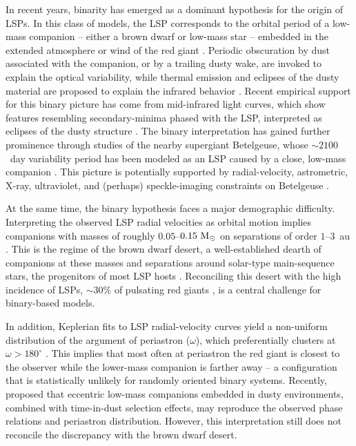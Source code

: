 \documentclass[trackchanges,twocolumn]{aastex631}
\begin{document}
In recent years, binarity has emerged as a dominant hypothesis for the origin of LSPs. In this class of models, the LSP corresponds to the orbital period of a low-mass companion -- either a brown dwarf or low-mass star -- embedded in the extended atmosphere or wind of the red giant \citep[e.g.,][]{Soszynski21}. Periodic obscuration by dust associated with the companion, or by a trailing dusty wake, are invoked to explain the optical variability, while thermal emission and eclipses of the dusty material are proposed to explain the infrared behavior \citep{Wood09,Soszynski21,Goldberg24,MacLeod25}. Recent empirical support for this binary picture has come from mid-infrared light curves, which show features resembling secondary-minima phased with the LSP, interpreted as eclipses of the dusty structure \citep{Soszynski21}. The binary interpretation has gained further prominence through studies of the nearby supergiant Betelgeuse, whose $\sim2100$~day variability period has been modeled as an LSP caused by a close, low-mass companion \citep[e.g.,][]{Goldberg24,MacLeod25}. This picture is potentially supported by radial-velocity, astrometric, X-ray, ultraviolet, and (perhaps) speckle-imaging constraints on Betelgeuse \citep{Goldberg24,MacLeod25,OGrady25,Goldberg25,Dupree26}.

At the same time, the binary hypothesis faces a major demographic difficulty. Interpreting the observed LSP radial velocities as orbital motion implies companions with masses of roughly $0.05$--$0.15~{\rm M_\odot}$ on separations of order $1$--$3$~au \citep[e.g.,][]{Nicholls09}. This is the regime of the brown dwarf desert, a well-established dearth of companions at these masses and separations around solar-type main-sequence stars, the progenitors of most LSP hosts \citep[e.g.,][]{Marcy00,Grether06}. Reconciling this desert with the high incidence of LSPs, $\sim30\%$ of pulsating red giants \citep{Pawlak21}, is a central challenge for binary-based models. 

In addition, Keplerian fits to LSP radial-velocity curves yield a non-uniform distribution of the argument of periastron ($\omega$), which preferentially clusters at $\omega > 180^\circ$ \citep[e.g.,][]{Wood04,Nicholls09}. This implies that most often at periastron the red giant is closest to the observer while the lower-mass companion is farther away -- a configuration that is statistically unlikely for randomly oriented binary systems. Recently, \citet{Decin25} proposed that eccentric low-mass companions embedded in dusty environments, combined with time-in-dust selection effects, may reproduce the observed phase relations and periastron distribution. However, this interpretation still does not reconcile the discrepancy with the brown dwarf desert.
\end{document}
